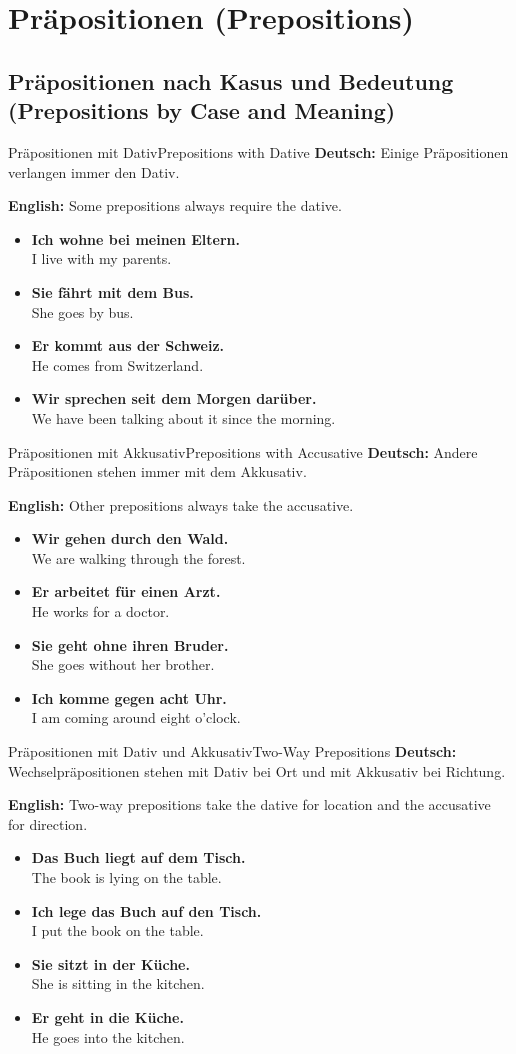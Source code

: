 \documentclass[a4paper,11pt]{article}
\newcommand{\GermanText}[1]{\textbf{Deutsch: }#1\par}
\newcommand{\EnglishText}[1]{{\color{SoftGray}\textbf{English: }#1\par}}
\newcommand{\ExampleItem}[2]{\item \textbf{#1}\\{\color{SoftGray}#2}}
\begin{document}
\section{Präpositionen {\small (Prepositions)}}

\subsection{Präpositionen nach Kasus und Bedeutung {\small (Prepositions by Case and Meaning)}}

\begin{grammarentry}{Präpositionen mit Dativ}{Prepositions with Dative}
    \GermanText{Einige Präpositionen verlangen immer den Dativ.}
    \EnglishText{Some prepositions always require the dative.}
    \begin{exbox}
        \begin{itemize}
            \ExampleItem{Ich wohne bei meinen Eltern.}{I live with my parents.}
            \ExampleItem{Sie fährt mit dem Bus.}{She goes by bus.}
            \ExampleItem{Er kommt aus der Schweiz.}{He comes from Switzerland.}
            \ExampleItem{Wir sprechen seit dem Morgen darüber.}{We have been talking about it since the morning.}
        \end{itemize}
    \end{exbox}
\end{grammarentry}

\begin{grammarentry}{Präpositionen mit Akkusativ}{Prepositions with Accusative}
    \GermanText{Andere Präpositionen stehen immer mit dem Akkusativ.}
    \EnglishText{Other prepositions always take the accusative.}
    \begin{exbox}
        \begin{itemize}
            \ExampleItem{Wir gehen durch den Wald.}{We are walking through the forest.}
            \ExampleItem{Er arbeitet für einen Arzt.}{He works for a doctor.}
            \ExampleItem{Sie geht ohne ihren Bruder.}{She goes without her brother.}
            \ExampleItem{Ich komme gegen acht Uhr.}{I am coming around eight o'clock.}
        \end{itemize}
    \end{exbox}
\end{grammarentry}

\begin{grammarentry}{Präpositionen mit Dativ und Akkusativ}{Two-Way Prepositions}
    \GermanText{Wechselpräpositionen stehen mit Dativ bei Ort und mit Akkusativ bei Richtung.}
    \EnglishText{Two-way prepositions take the dative for location and the accusative for direction.}
    \begin{exbox}
        \begin{itemize}
            \ExampleItem{Das Buch liegt auf dem Tisch.}{The book is lying on the table.}
            \ExampleItem{Ich lege das Buch auf den Tisch.}{I put the book on the table.}
            \ExampleItem{Sie sitzt in der Küche.}{She is sitting in the kitchen.}
            \ExampleItem{Er geht in die Küche.}{He goes into the kitchen.}
        \end{itemize}
    \end{exbox}
\end{grammarentry}
\end{document}
